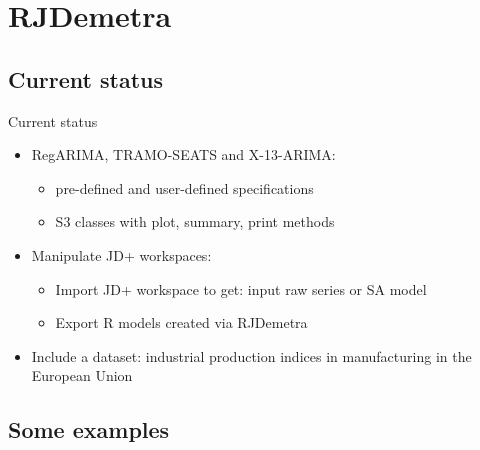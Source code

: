 \documentclass[10pt,xcolor=table,color={dvipsnames,usenames},ignorenonframetext,usepdftitle=false,french]{beamer}
\providecommand{\tightlist}{%
  \setlength{\parskip}{0pt}
  }
\begin{document}
\hypertarget{rjdemetra}{%
\section{RJDemetra}\label{rjdemetra}}

\hypertarget{current-status}{%
\subsection{Current status}\label{current-status}}

\begin{frame}{Current status}
\protect\hypertarget{current-status-1}{}

\begin{itemize}
\tightlist
\item
  RegARIMA, TRAMO-SEATS and X-13-ARIMA:

  \begin{itemize}
  \tightlist
  \item
    pre-defined and user-defined specifications\\
  \item
    S3 classes with plot, summary, print methods
  \end{itemize}
\item
  Manipulate JD+ workspaces:

  \begin{itemize}
  \tightlist
  \item
    Import JD+ workspace to get: input raw series or SA model
  \item
    Export R models created via RJDemetra
  \end{itemize}
\item
  Include a dataset: industrial production indices in manufacturing in
  the European Union
\end{itemize}

\end{frame}

\hypertarget{some-examples}{%
\subsection{Some examples}\label{some-examples}}
\end{document}

